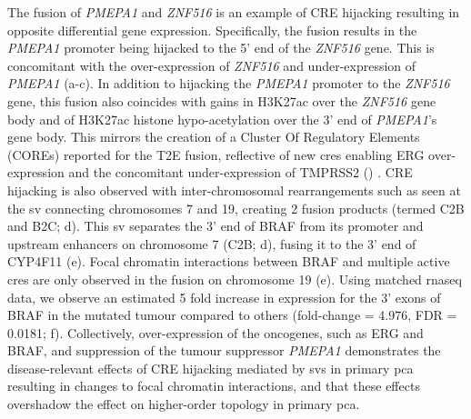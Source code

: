 The fusion of \emph{PMEPA1} and \emph{ZNF516} is an example of CRE hijacking resulting in opposite differential gene expression.
Specifically, the fusion results in the \emph{PMEPA1} promoter being hijacked to the 5' end of the \emph{ZNF516} gene.
This is concomitant with the over-expression of \emph{ZNF516} and under-expression of \emph{PMEPA1} (a-c).
In addition to hijacking the \emph{PMEPA1} promoter to the \emph{ZNF516} gene, this fusion also coincides with gains in H3K27ac over the \emph{ZNF516} gene body and of H3K27ac histone hypo-acetylation over the 3' end of \emph{PMEPA1}'s gene body.
This mirrors the creation of a Cluster Of Regulatory Elements (COREs) reported for the T2E fusion, reflective of new \glspl{cre} enabling ERG over-expression and the concomitant under-expression of TMPRSS2 () \cite{kronTMPRSS2ERGFusion2017,tomlinsRecurrentFusionTMPRSS22005,tomlinsDistinctClassesChromosomal2007}.
CRE hijacking is also observed with inter-chromosomal rearrangements such as seen at the \gls{sv} connecting chromosomes 7 and 19, creating 2 fusion products (termed C2B and B2C; d).
This \gls{sv} separates the 3' end of BRAF from its promoter and upstream enhancers on chromosome 7 (C2B; d), fusing it to the 3' end of CYP4F11 (e).
Focal chromatin interactions between BRAF and multiple active \glspl{cre} are only observed in the fusion on chromosome 19 (e).
Using matched \gls{rnaseq} data, we observe an estimated 5 fold increase in expression for the 3' exons of BRAF in the mutated tumour compared to others (fold-change = 4.976, FDR = 0.0181; f).
Collectively, over-expression of the oncogenes, such as ERG and BRAF, and suppression of the tumour suppressor \emph{PMEPA1} demonstrates the disease-relevant effects of CRE hijacking mediated by \glspl{sv} in primary \gls{pca} resulting in changes to focal chromatin interactions, and that these effects overshadow the effect on higher-order topology in primary \gls{pca}.

